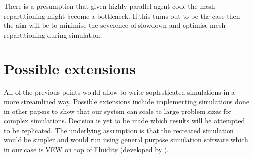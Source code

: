 \documentclass[12pt, a4paper]{report}
\begin{document}
There is a presumption that given highly parallel agent code the mesh repartitioning might become a bottleneck.
If this turns out to be the case then the aim will be to minimise the severence of slowdown and optimise
mesh repartitioning during simulation.

\section{Possible extensions}\label{sec:ext}

All of the previous points would allow to write sophisticated simulations in a more streamlined way. Possible
extensions include implementing simulations done in other papers to show that our system can scale to large
problem sizes for complex simulations. Decision is yet to be made which results will be attempted to be replicated.
The underlying assumption is that the recreated simulation would be simpler and would run using general purpose simulation
software which in our case is VEW on top of Fluidity (developed by \cite{FluidityVEW}).


 
\end{document}
